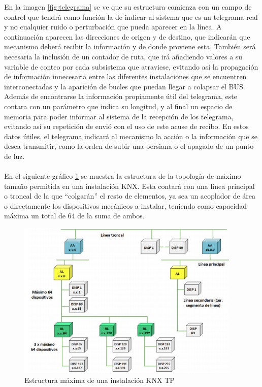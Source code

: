 En la imagen \ref{fig:telegrama} se ve que su estructura comienza con un campo de control que tendrá como función la de indicar al sistema que es un telegrama real y no cualquier ruido o perturbación que pueda aparecer en la línea. A continuación aparecen las direcciones de origen y de destino, que indicarán que mecanismo deberá recibir la información y de donde proviene esta. También será necesaria la inclusión de un contador de ruta, que irá añadiendo valores a su variable de conteo por cada subsistema que atraviese, evitando así la propagación de información innecesaria entre las diferentes instalaciones que se encuentren interconectadas y la aparición de bucles que puedan llegar a colapsar el BUS. Además de encontrarse la información propiamente útil del telegrama, este contara con un parámetro que indica su longitud, y al final un espacio de memoria para poder informar al sistema de la recepción de los telegrama, evitando así su repetición de envió con el uso de este acuse de recibo. En estos datos útiles, el telegrama indicará al mecanismo la acción o la información que se desea transmitir, como la orden de subir una persiana o el apagado de un punto de luz.\\\\
En el siguiente gráfico \ref{fig:estructura} se muestra la estructura de la topología de máximo tamaño permitida en una instalación KNX. Esta contará con una línea principal o troncal de la que “colgarán” el resto de elementos, ya sea un acoplador de área o directamente los dispositivos mecánicos a instalar, teniendo como capacidad máxima un total de 64 de la suma de ambos.  
\begin{figure}[H]
\centering
\includegraphics[width=0.95\textwidth]{figures/estructura.png} 
\caption{Estructura máxima de una instalación KNX TP}
\label{fig:estructura}
\end{figure}


